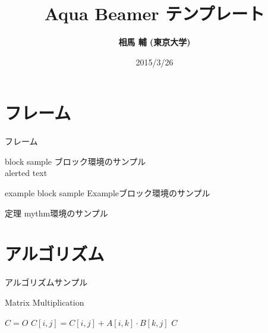 \documentclass[14pt,xcolor=dvipsnames,table,dvipdfmx,professional font]{beamer}
\title{Aqua Beamer テンプレート}
\author{\textbf{相馬 輔 (東京大学)}}
\date{2015/3/26}
\institute{ほげほげ研究室}
\theoremstyle{definition}
\newenvironment{mythm}{\begin{alertblock}{定理}}{\end{alertblock}} %
\begin{document}
\maketitle
\frame{\tableofcontents[hideallsubsections]}
\section{フレーム}
\begin{frame}{フレーム}
    \begin{block}{block sample}
        ブロック環境のサンプル\\
        \alert{alerted text}
    \end{block} 
    \vfill
    \begin{exampleblock}{example block sample}
        Exampleブロック環境のサンプル
    \end{exampleblock} 
    \vfill
    \begin{mythm}
        mythm環境のサンプル
    \end{mythm} 
\end{frame}

\section{アルゴリズム}
\begin{frame}{アルゴリズムサンプル}
    \begin{block}{Matrix Multiplication}
        \begin{algorithmic}[1]
            \STATE $C = O$
            \STATE $C[i,j] = C[i,j] + A[i, k] \cdot B[k, j]$
            \ENDFOR
            \ENDFOR
            \ENDFOR
            \RETURN $C$
        \end{algorithmic}
    \end{block}
\end{frame}
\end{document}
